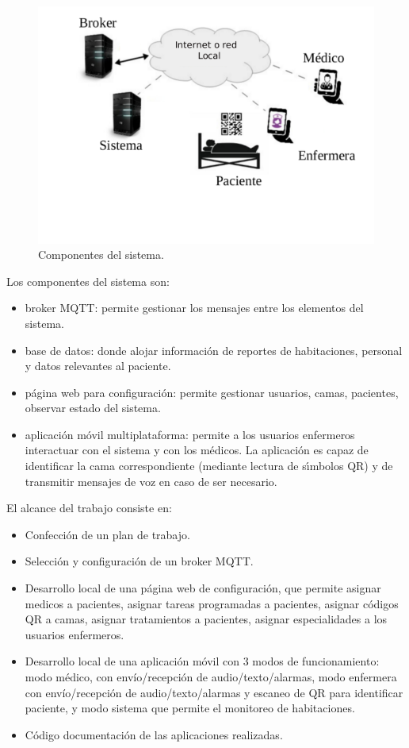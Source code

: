 \begin{figure}[ht]
	\centering
	\includegraphics[scale=.45]{./Figures/diag-redux.pdf}
	\caption{Componentes del sistema.}
	\label{fig:Figura-reducida}
\end{figure}


Los componentes del sistema son:
\begin{itemize}
\item broker MQTT: permite gestionar los mensajes entre los elementos del sistema.
\item base de datos: donde alojar información de reportes de habitaciones, personal y datos relevantes al paciente.
\item página web para configuración: permite gestionar usuarios, camas, pacientes, observar estado del sistema.
\item aplicación móvil multiplataforma: permite a los usuarios enfermeros interactuar con el sistema y con los médicos. La aplicación es capaz de identificar la cama correspondiente (mediante lectura de sı́mbolos QR) y de transmitir mensajes de voz en caso de ser necesario.
\end{itemize}


El alcance del trabajo consiste en:
\begin{itemize}
\item Confección de un plan de trabajo.
\item Selección y configuración de un broker MQTT.
\item Desarrollo local de una página web de configuración, que permite asignar medicos a pacientes, asignar tareas programadas a pacientes, asignar códigos QR a camas, asignar tratamientos a pacientes, asignar especialidades a los usuarios enfermeros.
\item Desarrollo local de una aplicación móvil con 3 modos de funcionamiento: modo médico, con envío/recepción de audio/texto/alarmas, modo enfermera con envío/recepción de audio/texto/alarmas y escaneo de QR para identificar paciente, y modo sistema que permite el monitoreo de habitaciones.
\item Código documentación de las aplicaciones realizadas.
\end{itemize}

